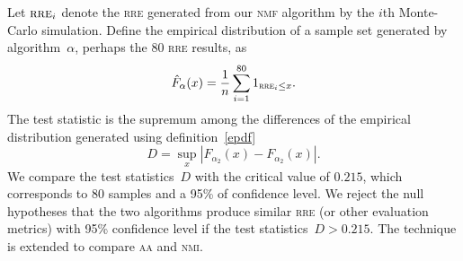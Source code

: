 Let $\textsc{rre}_i$ denote the \textsc{rre} generated from our \textsc{nmf} algorithm by the $i$th Monte-Carlo simulation. Define the empirical distribution of a sample set generated by algorithm~$\alpha$, perhaps the $80$ \textsc{rre} results, as
\begin{equation}\label{epdf}
  \hat{F}_{\alpha}(x)=\frac{1}{n}\sum_{i=1}^{80}1_{\textsc{rre}_i \leq x}.
\end{equation}
The test statistic is the supremum among the differences of the empirical distribution generated using definition~\eqref{epdf} \citep{Walck:1996cca}
\begin{equation}\label{teststatistic}
D=\sup _{x}\left|F_{\alpha_2}(x)-F_{\alpha_2}(x)\right|.
\end{equation}
We compare the test statistics~$D$ with the critical value of $0.215$, which corresponds to $80$ samples and a 95\% of confidence level. We reject the null hypotheses that the two algorithms produce similar \textsc{rre} (or other evaluation metrics) with 95\% confidence level if the test statistics~$D>0.215$. The technique is extended to compare \textsc{aa} and \textsc{nmi}.
